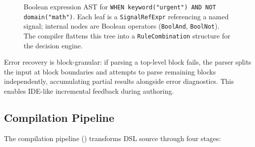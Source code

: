 \begin{figure}[!ht]
  \centering
  \caption{Boolean expression AST for \texttt{WHEN keyword("urgent") AND NOT domain("math")}. Each leaf is a \texttt{SignalRefExpr} referencing a named signal; internal nodes are Boolean operators (\texttt{BoolAnd}, \texttt{BoolNot}). The compiler flattens this tree into a \texttt{RuleCombination} structure for the decision engine.}
  \label{fig:bool_ast}
\end{figure}

Error recovery is block-granular: if parsing a top-level block fails, the parser splits the input at block boundaries and attempts to parse remaining blocks independently, accumulating partial results alongside error diagnostics.
This enables IDE-like incremental feedback during authoring.

\subsection{Compilation Pipeline}
\label{sec:dsl_compilation}

The compilation pipeline () transforms DSL source through four stages:

